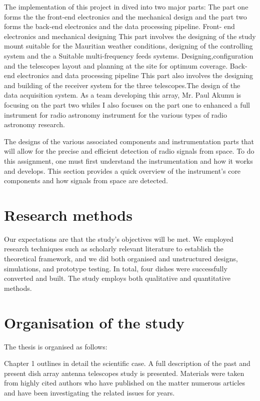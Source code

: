 {The implementation of this project in dived into two major parts: The part one forms the the front-end
electronics and the mechanical design and the part two forms the back-end electronics and the
data processing pipeline.
Front- end electronics and mechanical designing
This part involves the designing of the study mount suitable for the Mauritian weather conditions, designing of the controlling system and the a Suitable multi-frequency feeds systems.
Designing,configuration and the telescopes layout and planning at the site for optimum coverage.
Back-end electronics and data processing pipeline
This part also involves the designing and building of the receiver system for the three telescopes.The design of the data acquisition system. As a team developing this array, Mr. Paul
Akumu is focusing on the part two whiles I also focuses on the part one to enhanced a full
instrument for radio astronomy instrument for the various types of radio astronomy research.


The designs of the various associated components and instrumentation parts that will allow for the precise and efficient detection of radio signals from space. To do this assignment, one must first understand the instrumentation and how it works and develops. This section provides a quick overview of the instrument's core components and how signals from space are detected.

\section{Research methods}
Our expectations are that the study's objectives will be met.
We employed research techniques such as scholarly relevant literature to establish the theoretical framework, and we did both organised and unstructured designs, simulations, and prototype testing. In total, four dishes were successfully converted and built. The study employs both qualitative and quantitative methods.


\section{Organisation of the study}

The thesis is organised as follows:

Chapter 1 outlines in detail the scientific case. A full description of the past and present
dish array antenna telescopes study is presented. Materials were taken from highly cited authors who have
published on the matter numerous articles and have been investigating the related issues
for years.

}
